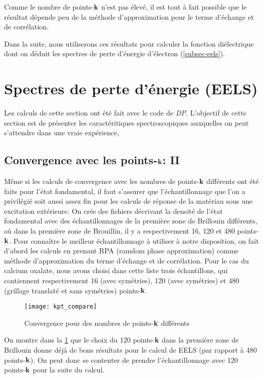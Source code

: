 Comme le nombre de points-$\vb{k}$ n'est pas élevé,
il est tout à fait possible que le résultat dépende peu de la méthode d'approximation
pour le terme d'échange et de corrélation.

Dans la suite, nous utiliserons ces résultats pour calculer la fonction diélectrique
dont on déduit les spectres de perte d'énergie d'électron (\cref{subsec-eels}).

\section{Spectres de perte d'énergie (EELS)}
Les calculs de cette section ont été fait avec le code de \textit{DP}.
L'objectif de cette section est de présenter les caractéritiques spectroscopiques
auxquelles on peut s'attendre dans une vraie expérience,

\subsection{Convergence avec les points-$\vb{k}$: II}
Même si les calculs de convergence avec les nombres de points-$\vb{k}$ différents ont été faits pour l'état fondamental,
il faut s'assurer que l'échantillonnage que l'on a privilégié soit aussi assez fin pour les calculs de réponse de la matériau sous une excitation extérieure.
On crée des fichiers décrivant la densité de l'état fondamental avec des échantillonnages
de la première zone de Brillouin différents,
où dans la première zone de Brouillin, il y a respectivement 16, 120 et 480 points-$\vb{k}$.
Pour connaître le meilleur échantillonnage à utiliser à notre disposition,
on fait d'abord les calculs en prenant RPA (ramdom phase approximation)
comme méthode d'approximation du terme d'échange et de corrélation.
Pour le cas du calcium oxalate, nous avons choisi dans cette liste trois échantillons,
qui contiennent respectivement 16 (avec symétries),
120 (avec symétries) et 480 (grillage translaté et sans symétries) points-$\vb{k}$.
\begin{figure}[!h]
    \centering
    \texttt{[image: kpt\_compare]}
    \caption{Convergence pour des nombres de points-$\vb{k}$ différents}\label{fig-kptCompare}
\end{figure}

On montre dans la \cref{fig-kptCompare} que le choix du 120 points-$\vb{k}$ dans la première zone de Brillouin
donne déjà de bons résultats pour le calcul de EELS (par rapport à 480 points-$\vb{k}$).
On peut donc se contenter de prendre l'échantillonnage avec 120 points-$\vb{k}$ pour la suite du calcul.


